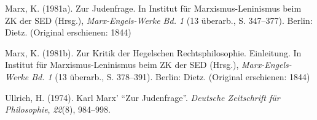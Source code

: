\documentclass[ngerman,12pt, titlepage, smallheadings, nomath]{scrartcl}
\begin{document}
\hypertarget{ref-marx1981}{}
Marx, K. (1981a). Zur Judenfrage. In Institut für Marxismus-Leninismus
beim ZK der SED (Hrsg.), \emph{Marx-Engels-Werke Bd. 1} (13 überarb., S.
347--377). Berlin: Dietz. (Original erschienen: 1844)

\hypertarget{ref-marx1981b}{}
Marx, K. (1981b). Zur Kritik der Hegelschen Rechtsphilosophie.
Einleitung. In Institut für Marxismus-Leninismus beim ZK der SED
(Hrsg.), \emph{Marx-Engels-Werke Bd. 1} (13 überarb., S. 378--391).
Berlin: Dietz. (Original erschienen: 1844)

\hypertarget{ref-ullrich1974}{}
Ullrich, H. (1974). Karl Marx' \enquote{Zur Judenfrage}. \emph{Deutsche
Zeitschrift für Philosophie}, \emph{22}(8), 984--998.
\end{document}
